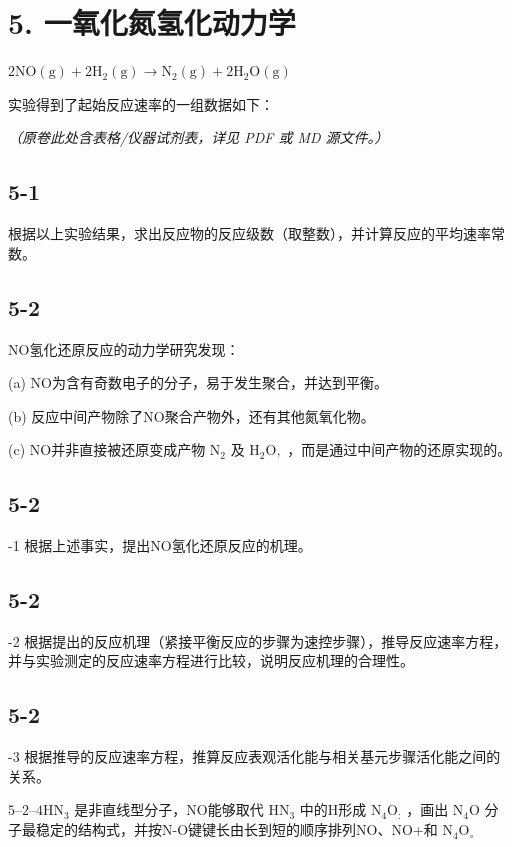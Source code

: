 \section*{5. 一氧化氮氢化动力学}
$
2 \mathrm{NO} (\mathrm{g}) + 2 \mathrm{H} _ {2} (\mathrm{g}) \rightarrow \mathrm{N} _ {2} (\mathrm{g}) + 2 \mathrm{H} _ {2} \mathrm{O} (\mathrm{g})
$

实验得到了起始反应速率的⼀组数据如下：

\textit{（原卷此处含表格/仪器试剂表，详见 PDF 或 MD 源文件。）}

\subsection*{5-1}
根据以上实验结果，求出反应物的反应级数（取整数），并计算反应的平均速率常数。

\subsection*{5-2}
NO氢化还原反应的动⼒学研究发现：

(a) NO为含有奇数电⼦的分⼦，易于发⽣聚合，并达到平衡。

(b) 反应中间产物除了NO聚合产物外，还有其他氮氧化物。

(c) NO并⾮直接被还原变成产物 $\mathrm { N } _ { 2 }$ 及 $\mathrm { H _ { 2 } O } ,$ ，⽽是通过中间产物的还原实现的。

\subsection*{5-2}
-1 根据上述事实，提出NO氢化还原反应的机理。

\subsection*{5-2}
-2 根据提出的反应机理（紧接平衡反应的步骤为速控步骤），推导反应速率⽅程，并与实验测定的反应速率⽅程进⾏⽐较，说明反应机理的合理性。

\subsection*{5-2}
-3 根据推导的反应速率⽅程，推算反应表观活化能与相关基元步骤活化能之间的关系。

$5 – 2 – 4 \mathrm { H N _ { 3 } }$ 是⾮直线型分⼦，NO能够取代 $\mathrm { H N } _ { 3 }$ 中的H形成 $\mathrm { N _ { 4 } O _ { : } }$ ，画出 $\mathrm { N } _ { 4 } \mathrm { O }$ 分⼦最稳定的结构式，并按N-O键键⻓由⻓到短的顺序排列NO、NO+和 $\mathrm { N } _ { 4 } \mathrm { O } _ { \circ }$
